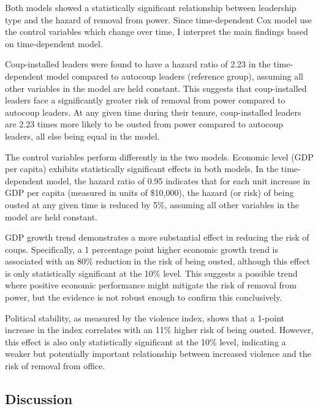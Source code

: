 \documentclass[
  12pt,
]{article}
\begin{document}
\begin{table}
{}

\end{table}%

Both models showed a statistically significant relationship between
leadership type and the hazard of removal from power. Since
time-dependent Cox model use the control variables which change over
time, I interpret the main findings based on time-dependent model.

Coup-installed leaders were found to have a hazard ratio of 2.23 in the
time-dependent model compared to autocoup leaders (reference group),
assuming all other variables in the model are held constant. This
suggests that coup-installed leaders face a significantly greater risk
of removal from power compared to autocoup leaders. At any given time
during their tenure, coup-installed leaders are 2.23 times more likely
to be ousted from power compared to autocoup leaders, all else being
equal in the model.

The control variables perform differently in the two models. Economic
level (GDP per capita) exhibits statistically significant effects in
both models. In the time-dependent model, the hazard ratio of 0.95
indicates that for each unit increase in GDP per capita (measured in
units of \$10,000), the hazard (or risk) of being ousted at any given
time is reduced by 5\%, assuming all other variables in the model are
held constant.

GDP growth trend demonstrates a more substantial effect in reducing the
risk of coups. Specifically, a 1 percentage point higher economic growth
trend is associated with an 80\% reduction in the risk of being ousted,
although this effect is only statistically significant at the 10\%
level. This suggests a possible trend where positive economic
performance might mitigate the risk of removal from power, but the
evidence is not robust enough to confirm this conclusively.

Political stability, as measured by the violence index, shows that a
1-point increase in the index correlates with an 11\% higher risk of
being ousted. However, this effect is also only statistically
significant at the 10\% level, indicating a weaker but potentially
important relationship between increased violence and the risk of
removal from office.

\subsection{Discussion}\label{discussion}
\end{document}
